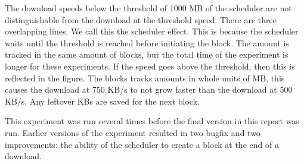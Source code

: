 The download speeds below the threshold of 1000 MB of the scheduler
are not distinguishable from the download at the threshold speed.
There are three overlapping lines.
We call this the scheduler effect.
This is because the scheduler waits until the threshold is reached before initiating the block.
The amount is tracked in the same amount of blocks,
but the total time of the experiment is longer for these experiments.
If the speed goes above the threshold, then this is reflected in the figure.
The blocks tracks amounts in whole units of MB,
this causes the download at 750 KB/s to not grow faster than the download at 500 KB/s.
Any leftover KBs are saved for the next block.

This experiment was run several times before the final version in this report was run.
Earlier versions of the experiment resulted in two bugfix and two improvements:
the ability of the scheduler to create a block at the end of a download.